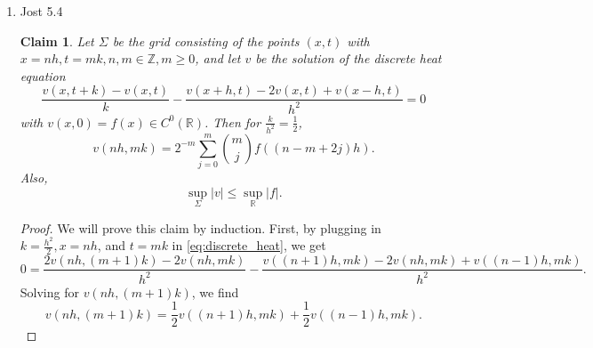 \documentclass[a4paper]{article}
\newtheorem*{claim}{Claim}
\newcommand{\R}{\mathbb{R}}
\newcommand{\Z}{\mathbb{Z}}
\begin{document}
\begin{enumerate}
\begin{proof}
    Because $u$ is continuous, by taking $\varepsilon \to 0$, we get $(x_0, t_0) \in \partial^\ast \Omega_T$, as desired.

    If $T = \infty$, we apply the same argument on every bounded domain.

    For the general case, we assume
    \[ u_t - Lu \leq 0 .\]
    Define $v = u - \varepsilon t$ for some $\varepsilon >0$. We have
    \begin{align*}
      v_t &= u_t - \varepsilon \\
      \leq Lu - \varepsilon \\
      &= Lv - \varepsilon \\
      < Lv
    \end{align*}
    Therefore, we know $v_t - Lv < 0$. We can then apply the work above to get
    \begin{align*}
      \max_{ \overline{\Omega}_T } u &= \max_{ \overline{\Omega}_T } (v + \varepsilon t) \\
      &\leq \max_{ \overline{\Omega_T} } v + \varepsilon T \\
      &= \max_{\partial^\ast \Omega_T} v + \varepsilon T \\
      &\leq \max_{\partial^\ast \Omega_T} u + \varepsilon T
    \end{align*}

    By letting $\varepsilon \to 0$, we get
    \[ \max_{\overline{\Omega}_T } u = \max_{\partial^\ast \Omega_T} u .\]

  \end{proof}

  \item Jost 5.4
    \begin{claim}
      Let $\Sigma$ be the grid consisting of the points $(x,t)$ with $x = nh, t = mk, n,m \in \Z, m \geq 0$, and let $v$ be the solution of the
      discrete heat equation
      \begin{equation} \label{eq:discrete_heat}
        \frac{v(x,t+k) - v(x,t)}{k} - \frac{v(x+h,t) - 2v(x,t) + v(x-h,t)}{h^2} = 0
    \end{equation}
      with $v(x,0) = f(x) \in C^0(\R)$.
      Then for $\frac{k}{h^2} = \frac{1}{2}$,
      \[ v(nh, mk) = 2^{-m} \sum_{j=0}^m \binom{m}{j} f \left( (n - m + 2j)h \right) .\]
      Also,
      \[ \sup_{\Sigma} |v| \leq \sup_\R |f|. \]
    \end{claim}

    \begin{proof}
      We will prove this claim by induction.
      First, by plugging in $k=\frac{h^2}{2}, x = nh$, and $t = mk$ in \eqref{eq:discrete_heat}, we get
      \begin{equation} \label{eq:heat_rec}
        0 = \frac{2 v(nh, (m+1)k) - 2v(nh,mk)}{h^2} - \frac{v((n+1)h,mk) - 2v(nh,mk) + v(( n-1)h,mk) }{h^2} .
      \end{equation}
      Solving for $v(nh,(m+1)k)$, we find
      \[ v(nh,(m+1)k) = \frac{1}{2} v( (n+1)h, mk) + \frac{1}{2} v( (n-1)h, mk) .\]


\end{proof}
\end{enumerate}
\end{document}
